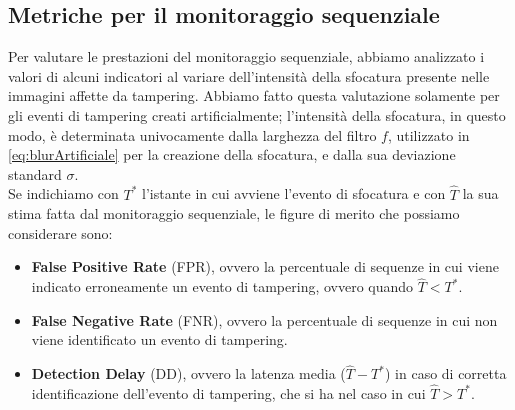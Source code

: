 \subsection{Metriche per il monitoraggio sequenziale}
Per valutare le prestazioni del monitoraggio sequenziale, abbiamo analizzato i valori di alcuni indicatori al variare dell'intensit\`a della sfocatura presente nelle immagini affette da tampering.
Abbiamo fatto questa valutazione solamente per gli eventi di tampering creati artificialmente; l'intensit\`a della sfocatura, in questo modo, \`e determinata univocamente dalla larghezza del filtro $f$, utilizzato in \eqref{eq:blurArtificiale} per la creazione della sfocatura, e dalla sua deviazione standard $\sigma$.\\
Se indichiamo con $T^*$ l'istante in cui avviene l'evento di sfocatura e con $\widehat{T}$ la sua stima fatta dal monitoraggio sequenziale, le figure di merito che possiamo considerare sono:
\begin{itemize}
	\item \textbf{False Positive Rate} (FPR), ovvero la percentuale di sequenze in cui viene indicato erroneamente un evento di tampering, ovvero quando $\widehat{T}<T^*$.
	\item \textbf{False Negative Rate} (FNR), ovvero la percentuale di sequenze in cui non viene identificato un evento di tampering.
	\item \textbf{Detection Delay} (DD), ovvero la latenza media ($\widehat{T} - T^*$) in caso di corretta identificazione dell'evento di tampering, che si ha nel caso in cui $\widehat{T}>T^*$.
\end{itemize}
